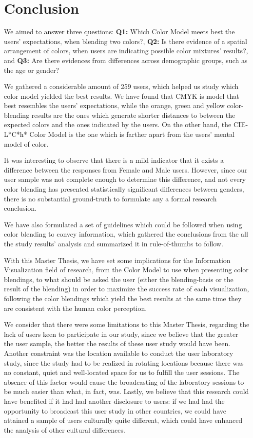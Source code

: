 
\section{Conclusion}
\label{sec:conclusion}
%
We aimed to answer three questions: \textbf{Q1:} Which Color Model meets best the users' expectations,
when blending two colors?, \textbf{Q2:} Is there evidence of a spatial arrangement of colors, when
users are indicating possible color mixtures' results?, and \textbf{Q3:} Are there evidences from
differences across demographic groups, such as the age or gender? \par
%
We gathered a considerable amount of 259 users, which helped us study which color model yielded the
best results. We have found that CMYK is model that best resembles the users' expectations, while
the orange, green and yellow color-blending results are the ones which generate shorter distances to
between the expected colors and the ones indicated by the users. On the other hand, the CIE-L*C*h*
Color Model is the one which is farther apart from the users' mental model of color. \par
%
It was interesting to observe that there is a mild indicator that it exists a difference between the
responses from Female and Male users. However, since our user sample was not complete enough to
determine this difference, and not every color blending has presented statistically significant
differences between genders, there is no substantial ground-truth to formulate any a formal research conclusion. \par
%
We have also formulated a set of guidelines which could be followed when using color blending to
convey information, which gathered the conclusions from the all the study results' analysis and
summarized it in rule-of-thumbs to follow. \par
%
With this Master Thesis, we have set some implications for the Information Visualization field of
research, from the Color Model to use when presenting color blendings, to what should be asked the
user (either the blending-basis or the result of the blending) in order to maximize the success
rate of each visualization, following the color blendings which yield the best results at the same
time they are consistent with the human color perception. \par
%
We consider that there were some limitations to this Master Thesis, regarding the lack of users
keen to participate in our study, since we believe that the greater the user sample, the better
the results of these user study would have been. Another constraint was the location available
to conduct the user laboratory study, since the study had to be realized in rotating locations
because there was no constant, quiet and well-located space for us to fulfill the user sessions.
The absence of this factor would cause the broadcasting of the laboratory sessions to be much
easier than what, in fact, was. Lastly, we believe that this research could have benefited if
it had had another disclosure to users: if we had had the opportunity to broadcast this user
study in other countries, we could have attained a sample of users culturally quite different,
which could have enhanced the analysis of other cultural differences.
%
